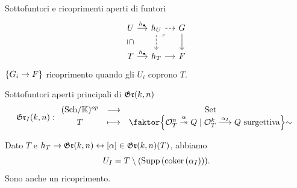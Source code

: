 \documentclass[a4paper]{beamer}
\begin{document}










\begin{frame}{Sottofuntori e ricoprimenti aperti di funtori}
\[\begin{tikzcd}[ampersand replacement=\&, column sep=small]
	U \& {h_{U}} \& G \\
	T \& {h_T} \& F
	\arrow["\yo", from=1-1, to=1-2]
	\arrow["\subseteq"{marking, allow upside down}, draw=none, from=1-1, to=2-1]
	\arrow[dashed, from=1-2, to=1-3]
	\arrow[dashed, from=1-2, to=2-2]
	\arrow["\ulcorner"{anchor=center, pos=0.125}, draw=none, from=1-2, to=2-3]
	\arrow[from=1-3, to=2-3]
	\arrow["\yo", from=2-1, to=2-2]
	\arrow[from=2-2, to=2-3]
\end{tikzcd}\]
$\left\{{G_i\to F}\right\}$ ricoprimento quando gli $U_i$ coprono $T$.
\pause
\begin{block}{Sottofuntori aperti principali di $\mathfrak{Gr}(k,n)$}
\[\gr_I(k,n):\funcDef{(\Sch\K)\op}{\Set}{T}{\quot{\cpa{\Oc_T^n\overset{\al}\onto Q\mid \Oc_T^k\overset{\al_I}{\longrightarrow} Q\text{ surgettiva}}}\sim}\]
\end{block}
\pause
Dato $T$ e $h_T\to \mathfrak{Gr}(k,n)\leftrightarrow [\alpha]\in \mathfrak{Gr}(k,n)(T)$, abbiamo \[U_I=T\setminus (\mathrm{Supp}\, (\mathrm{coker}\,(\alpha_I))).\]
Sono anche un ricoprimento.
\end{frame}
\end{document}
